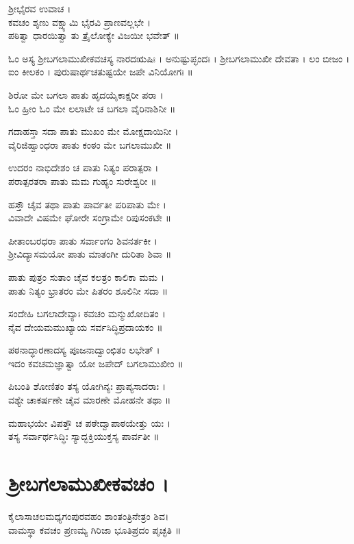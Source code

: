 ಶ್ರೀಭೈರವ ಉವಾಚ ।\\
ಕವಚಂ ಶೃಣು ವಕ್ಷ್ಯಾಮಿ ಭೈರವಿ ಪ್ರಾಣವಲ್ಲಭೇ ।\\
ಪಠಿತ್ವಾ ಧಾರಯಿತ್ವಾ ತು ತ್ರೈಲೋಕ್ಯೇ ವಿಜಯೀ ಭವೇತ್ ॥

ಓಂ ಅಸ್ಯ ಶ್ರೀಬಗಲಾಮುಖೀಕವಚಸ್ಯ ನಾರದಋಷಿಃ । ಅನುಷ್ಟುಪ್ಛಂದಃ । ಶ್ರೀಬಗಲಾಮುಖೀ ದೇವತಾ । ಲಂ ಬೀಜಂ । ಐಂ ಕೀಲಕಂ । ಪುರುಷಾರ್ಥಚತುಷ್ಟಯೇ ಜಪೇ ವಿನಿಯೋಗಃ ॥

ಶಿರೋ ಮೇ ಬಗಲಾ ಪಾತು ಹೃದಯೈಕಾಕ್ಷರೀ ಪರಾ ।\\
ಓಂ ಹ್ರೀಂ ಓಂ ಮೇ ಲಲಾಟೇ ಚ ಬಗಲಾ ವೈರಿನಾಶಿನೀ ॥

ಗದಾಹಸ್ತಾ ಸದಾ ಪಾತು ಮುಖಂ ಮೇ ಮೋಕ್ಷದಾಯಿನೀ ।\\
ವೈರಿಜಿಹ್ವಾಂಧರಾ ಪಾತು ಕಂಠಂ ಮೇ ಬಗಲಾಮುಖೀ ॥

ಉದರಂ ನಾಭಿದೇಶಂ ಚ ಪಾತು ನಿತ್ಯಂ ಪರಾತ್ಪರಾ ।\\
ಪರಾತ್ಪರತರಾ ಪಾತು ಮಮ ಗುಹ್ಯಂ ಸುರೇಶ್ವರೀ ॥

ಹಸ್ತೌ ಚೈವ ತಥಾ ಪಾತು ಪಾರ್ವತೀ ಪರಿಪಾತು ಮೇ ।\\
ವಿವಾದೇ ವಿಷಮೇ ಘೋರೇ ಸಂಗ್ರಾಮೇ ರಿಪುಸಂಕಟೇ ॥

ಪೀತಾಂಬರಧರಾ ಪಾತು ಸರ್ವಾಂಗಂ ಶಿವನರ್ತಕೀ ।\\
ಶ್ರೀವಿದ್ಯಾಸಮಯೋ ಪಾತು ಮಾತಂಗೀ ದುರಿತಾ ಶಿವಾ ॥

ಪಾತು ಪುತ್ರಂ ಸುತಾಂ ಚೈವ ಕಲತ್ರಂ ಕಾಲಿಕಾ ಮಮ ।\\
ಪಾತು ನಿತ್ಯಂ ಭ್ರಾತರಂ ಮೇ ಪಿತರಂ ಶೂಲಿನೀ ಸದಾ ॥

ಸಂದೇಹಿ ಬಗಲಾದೇವ್ಯಾಃ ಕವಚಂ ಮನ್ಮುಖೋದಿತಂ ।\\
ನೈವ ದೇಯಮಮುಖ್ಯಾಯ ಸರ್ವಸಿದ್ಧಿಪ್ರದಾಯಕಂ ॥

ಪಠನಾದ್ಧಾರಣಾದಸ್ಯ ಪೂಜನಾದ್ವಾಂಛಿತಂ ಲಭೇತ್ ।\\
ಇದಂ ಕವಚಮಜ್ಞಾತ್ವಾ ಯೋ ಜಪೇದ್ ಬಗಲಾಮುಖೀಂ ॥

ಪಿಬಂತಿ ಶೋಣಿತಂ ತಸ್ಯ ಯೋಗಿನ್ಯಃ ಪ್ರಾಪ್ಯಸಾದರಾಃ ।\\
ವಶ್ಯೇ ಚಾಕರ್ಷಣೇ ಚೈವ ಮಾರಣೇ ಮೋಹನೇ ತಥಾ ॥

ಮಹಾಭಯೇ ವಿಪತ್ತೌ ಚ ಪಠೇದ್ವಾಪಾಠಯೇತ್ತು ಯಃ ।\\
ತಸ್ಯ ಸರ್ವಾರ್ಥಸಿದ್ಧಿಃ ಸ್ಯಾದ್ಭಕ್ತಿಯುಕ್ತಸ್ಯ ಪಾರ್ವತೀ ॥

\section{ಶ್ರೀಬಗಲಾಮುಖೀಕವಚಂ ।}
ಕೈಲಾಸಾಚಲಮಧ್ಯಗಂಪುರವಹಂ ಶಾಂತಂತ್ರಿನೇತ್ರಂ ಶಿವ।\\
ವಾಮಸ್ಥಾ ಕವಚಂ ಪ್ರಣಮ್ಯ ಗಿರಿಜಾ ಭೂತಿಪ್ರದಂ ಪೃಚ್ಛತಿ ॥

